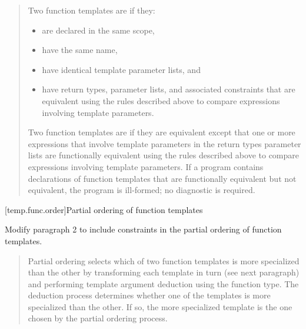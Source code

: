 \begin{quote}
\setcounter{Paras}{5}
\pnum
{}
% 
\begin{addedblock}
Two function templates are  if they:
\begin{itemize}
\item are declared in the same scope,

\item have the same name,

\item have identical template parameter lists, and

\item have return types, parameter lists, and associated constraints that 
are equivalent using the rules described above to compare expressions 
involving template parameters.
\end{itemize}
\end{addedblock}
% 
Two function templates are  if they 
are equivalent except that one or more expressions that involve 
template parameters in the return types\added{,}  parameter 
lists
are functionally equivalent using the rules described above to compare 
expressions involving template parameters.
% 
If a program contains declarations of function templates that are 
functionally equivalent but not equivalent, the program is ill-formed; 
no diagnostic is required.
\end{quote}


[temp.func.order]{Partial ordering of function templates}

Modify paragraph 2 to include constraints in the partial ordering
of function templates.

\begin{quote}
\setcounter{Paras}{1}
\pnum
Partial ordering selects which of two function templates is 
more specialized than the other by transforming each template 
in turn (see next paragraph) and performing template argument 
deduction using the function type. The deduction process 
determines whether one of the templates is more specialized 
than the other.
% 
If so, the more specialized template is the one chosen by the 
partial ordering process. 
% 
\end{quote}

